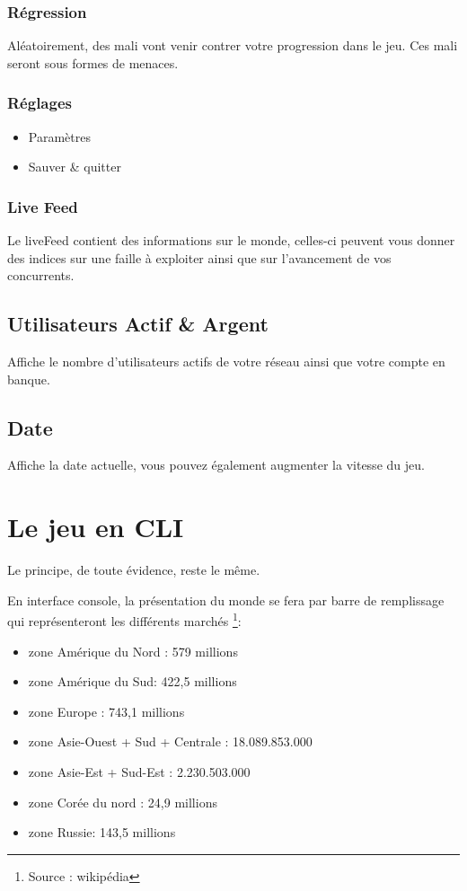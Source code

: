 \subsubsection{Régression}

Aléatoirement, des mali vont venir contrer votre progression dans le jeu. Ces mali seront sous formes de menaces. 

\subsubsection{Réglages}
\begin{itemize}
            \item Paramètres
            \item Sauver \& quitter
\end{itemize}
\subsubsection{Live Feed}
Le liveFeed contient des informations sur le monde, celles-ci peuvent vous donner des indices sur une faille à exploiter ainsi que sur l'avancement de vos concurrents.
\subsection{Utilisateurs Actif \& Argent}
Affiche le nombre d'utilisateurs actifs de votre réseau ainsi que votre compte en banque.
\subsection{Date}
Affiche la date actuelle, vous pouvez également augmenter la vitesse du jeu.

\section{Le jeu en CLI}
Le principe, de toute évidence, reste le même.

En interface console, la présentation du monde se fera par barre de remplissage qui représenteront les différents marchés \footnote{Source : wikipédia}: 
    \begin{itemize}
                \item zone Amérique du Nord : 579 millions
                \item zone Amérique du Sud: 422,5 millions
                \item zone Europe : 743,1 millions 
                \item zone Asie-Ouest + Sud + Centrale : 18.089.853.000
                \item zone Asie-Est + Sud-Est : 2.230.503.000
                \item zone Corée du nord : 24,9 millions 
                \item zone Russie: 143,5 millions 
    \end{itemize}


